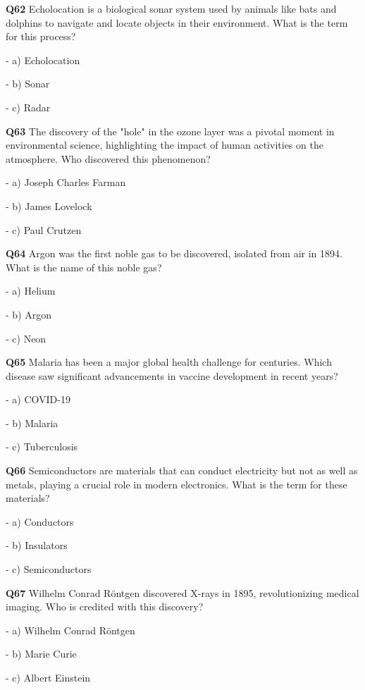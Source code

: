 \textbf{Q62} Echolocation is a biological sonar system used by animals like bats and dolphins to navigate and locate objects in their environment. What is the term for this process?\par
\quad - a) Echolocation\par
\quad - b) Sonar\par
\quad - c) Radar\par

\textbf{Q63} The discovery of the "hole" in the ozone layer was a pivotal moment in environmental science, highlighting the impact of human activities on the atmosphere. Who discovered this phenomenon?\par
\quad - a) Joseph Charles Farman\par
\quad - b) James Lovelock\par
\quad - c) Paul Crutzen\par

\textbf{Q64} Argon was the first noble gas to be discovered, isolated from air in 1894. What is the name of this noble gas?\par
\quad - a) Helium\par
\quad - b) Argon\par
\quad - c) Neon\par

\textbf{Q65} Malaria has been a major global health challenge for centuries. Which disease saw significant advancements in vaccine development in recent years?\par
\quad - a) COVID-19\par
\quad - b) Malaria\par
\quad - c) Tuberculosis\par

\textbf{Q66} Semiconductors are materials that can conduct electricity but not as well as metals, playing a crucial role in modern electronics. What is the term for these materials?\par
\quad - a) Conductors\par
\quad - b) Insulators\par
\quad - c) Semiconductors\par

\textbf{Q67} Wilhelm Conrad Röntgen discovered X-rays in 1895, revolutionizing medical imaging. Who is credited with this discovery?\par
\quad - a) Wilhelm Conrad Röntgen\par
\quad - b) Marie Curie\par
\quad - c) Albert Einstein\par

